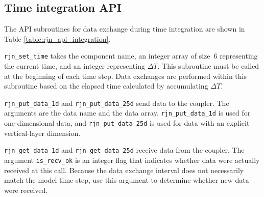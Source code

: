 \documentclass[11pt,a4paper]{report}
\newcommand{\tabref}[1]{Table \ref{#1}}
\begin{document}
\subsection{Time integration API}

The API subroutines for data exchange
during time integration
are shown in \tabref{table:rjn_api_integration}.

\texttt{rjn\_set\_time} takes the component name,
an integer array of size~6
representing the current time,
and an integer representing $\Delta T$.
This subroutine must be called
at the beginning of each time step.
Data exchanges are performed within this subroutine
based on the elapsed time
calculated by accumulating $\Delta T$.

\texttt{rjn\_put\_data\_1d} and \texttt{rjn\_put\_data\_25d}
send data to the coupler.
The arguments are the data name
and the data array.
\texttt{rjn\_put\_data\_1d} is used for one-dimensional data,
and \texttt{rjn\_put\_data\_25d} is used for data with
an explicit vertical-layer dimension.

\texttt{rjn\_get\_data\_1d} and \texttt{rjn\_get\_data\_25d}
receive data from the coupler.
The argument \texttt{is\_recv\_ok}
is an integer flag that indicates
whether data were actually received at this call.
Because the data exchange interval
does not necessarily match the model time step,
use this argument to determine
whether new data were received.
\end{document}
